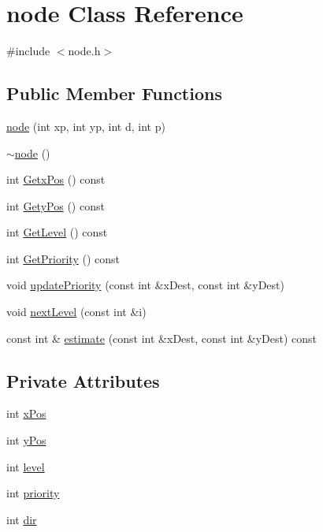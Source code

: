 \hypertarget{classnode}{}\section{node Class Reference}
\label{classnode}


{\ttfamily \#include $<$node.\+h$>$}

\subsection*{Public Member Functions}
\begin{DoxyCompactItemize}
\item 
\mbox{\hyperlink{classnode_a802701cab6639590de6f16136184c2de}{node}} (int xp, int yp, int d, int p)
\item 
\mbox{\hyperlink{classnode_a482f83436a89f09d289b26144d817adf}{$\sim$node}} ()
\item 
int \mbox{\hyperlink{classnode_a32e22b8a1fb6be6efa7348cc848600cf}{Getx\+Pos}} () const
\item 
int \mbox{\hyperlink{classnode_a0d644ed02899013bdc6e222afefb4c25}{Gety\+Pos}} () const
\item 
int \mbox{\hyperlink{classnode_a8f168b85b9bdf0a837f5070e5af6f009}{Get\+Level}} () const
\item 
int \mbox{\hyperlink{classnode_afa8c64a3cf2d61348b69b7e68233aa8d}{Get\+Priority}} () const
\item 
void \mbox{\hyperlink{classnode_ad51b92de008bd5107a7b55cc61fc497b}{update\+Priority}} (const int \&x\+Dest, const int \&y\+Dest)
\item 
void \mbox{\hyperlink{classnode_a04a186013c42fb942b6da90d2e98d4ed}{next\+Level}} (const int \&i)
\item 
const int \& \mbox{\hyperlink{classnode_acd0a1c2330a9984fa120fe7a6f169680}{estimate}} (const int \&x\+Dest, const int \&y\+Dest) const
\end{DoxyCompactItemize}
\subsection*{Private Attributes}
\begin{DoxyCompactItemize}
\item 
int \mbox{\hyperlink{classnode_ac06985c464545107563b940285cb7883}{x\+Pos}}
\item 
int \mbox{\hyperlink{classnode_ae878a5c532b967296df247e1006adc51}{y\+Pos}}
\item 
int \mbox{\hyperlink{classnode_a3871d43e823ba9542b052912d01709dd}{level}}
\item 
int \mbox{\hyperlink{classnode_a44e51013eb31fc1f17866ca9fe8ac75b}{priority}}
\item 
int \mbox{\hyperlink{classnode_a6dabe9db170ea2dbfc8c88df9c196506}{dir}}
\end{DoxyCompactItemize}


